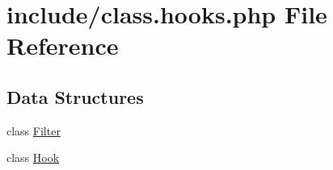 \hypertarget{class_8hooks_8php}{\section{include/class.hooks.\-php File Reference}
\label{class_8hooks_8php}
}
\subsection*{Data Structures}
\begin{DoxyCompactItemize}
\item 
class \hyperlink{class_filter}{Filter}
\item 
class \hyperlink{class_hook}{Hook}
\end{DoxyCompactItemize}
